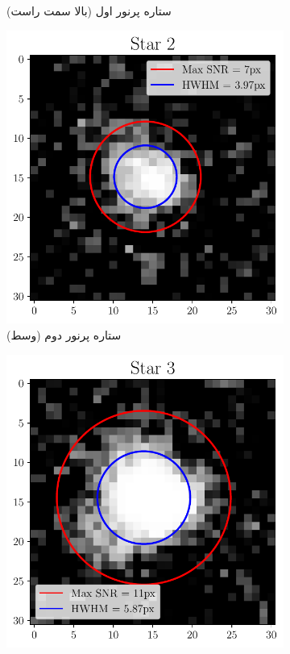 \documentclass[12pt,a4paper]{article}
\begin{document}
\begin{figure}[h!]
\begin{subfigure}{0.49\linewidth}
			\caption{ستاره پرنور اول (بالا سمت راست)}
		\end{subfigure}
		\begin{subfigure}{0.49\linewidth}
			\centering
			\includegraphics[width=\linewidth]{../fig/star2}
			\caption{ستاره پرنور دوم (وسط)}
		\end{subfigure}
		\begin{subfigure}{0.49\linewidth}
			\centering
			\includegraphics[width=\linewidth]{../fig/star3}

\end{subfigure}
\end{figure}
\end{document}
